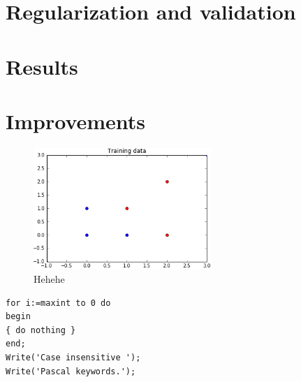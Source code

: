 \documentclass[a4paper]{article}
\numberwithin{equation}{section}
\begin{document}
\section{Regularization and validation}

\section{Results}

\section{Improvements}

\begin{figure}[h!]
	\centering
	\includegraphics[page=1,width=0.60\textwidth]{diagram.png}
	\caption{\label{fig:diagram}{Hehehe}}
\end{figure}

\begin{lstlisting}[frame=single]
for i:=maxint to 0 do
begin
{ do nothing }
end;
Write('Case insensitive ');
Write('Pascal keywords.');
\end{lstlisting}
\end{document}
